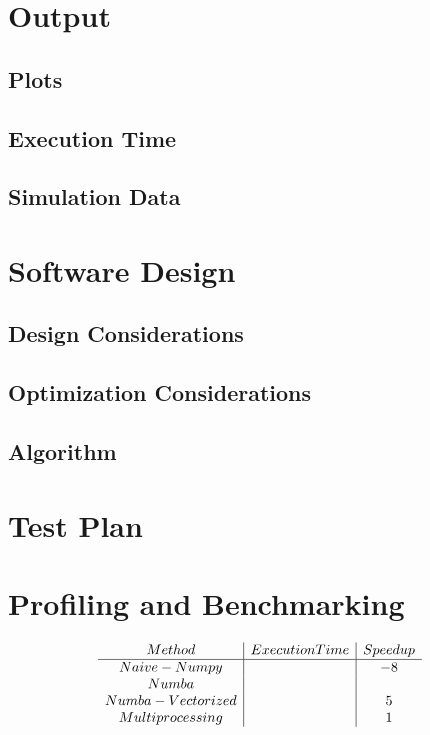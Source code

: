 \documentclass{article}
\begin{document}
\section{Output}

\subsection{Plots}

\subsection{Execution Time}

\subsection{Simulation Data}


\section{Software Design}

\subsection{Design Considerations}

\subsection{Optimization Considerations}

\subsection{Algorithm}

\section{Test Plan}



\section{Profiling and Benchmarking}

\begin{align}
    \begin{array}{c | c | c}
         Method  & Execution Time & Speedup \\ 
         \hline %
         Naive-Numpy   &  & -8 \\
         Numba      &  &    \\
         Numba - Vectorized &  & 5 \\
         Multiprocessing &  & 1 \\
    \end{array}
\end{align}
\end{document}
